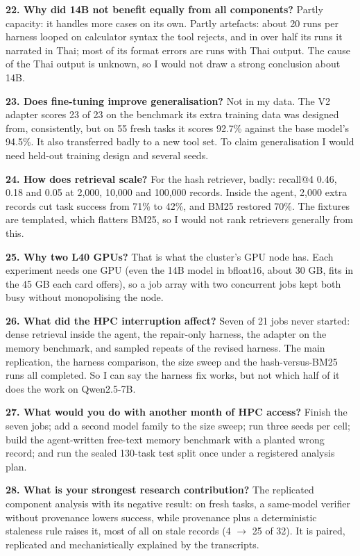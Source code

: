 \documentclass[10.5pt,a4paper,oneside]{report}
\begin{document}
\textbf{22. Why did 14B not benefit equally from all components?} Partly capacity: it handles more cases on its own. Partly artefacts: about 20 runs per harness looped on calculator syntax the tool rejects, and in over half its runs it narrated in Thai; most of its format errors are runs with Thai output. The cause of the Thai output is unknown, so I would not draw a strong conclusion about 14B.

\textbf{23. Does fine-tuning improve generalisation?} Not in my data. The V2 adapter scores 23 of 23 on the benchmark its extra training data was designed from, consistently, but on 55 fresh tasks it scores 92.7\% against the base model's 94.5\%. It also transferred badly to a new tool set. To claim generalisation I would need held-out training design and several seeds.

\textbf{24. How does retrieval scale?} For the hash retriever, badly: recall@4 0.46, 0.18 and 0.05 at 2,000, 10,000 and 100,000 records. Inside the agent, 2,000 extra records cut task success from 71\% to 42\%, and BM25 restored 70\%. The fixtures are templated, which flatters BM25, so I would not rank retrievers generally from this.

\textbf{25. Why two L40 GPUs?} That is what the cluster's GPU node has. Each experiment needs one GPU (even the 14B model in bfloat16, about 30 GB, fits in the 45 GB each card offers), so a job array with two concurrent jobs kept both busy without monopolising the node.

\textbf{26. What did the HPC interruption affect?} Seven of 21 jobs never started: dense retrieval inside the agent, the repair-only harness, the adapter on the memory benchmark, and sampled repeats of the revised harness. The main replication, the harness comparison, the size sweep and the hash-versus-BM25 runs all completed. So I can say the harness fix works, but not which half of it does the work on Qwen2.5-7B.

\textbf{27. What would you do with another month of HPC access?} Finish the seven jobs; add a second model family to the size sweep; run three seeds per cell; build the agent-written free-text memory benchmark with a planted wrong record; and run the sealed 130-task test split once under a registered analysis plan.

\textbf{28. What is your strongest research contribution?} The replicated component analysis with its negative result: on fresh tasks, a same-model verifier without provenance lowers success, while provenance plus a deterministic staleness rule raises it, most of all on stale records (4 $\rightarrow$ 25 of 32). It is paired, replicated and mechanistically explained by the transcripts.
\end{document}
